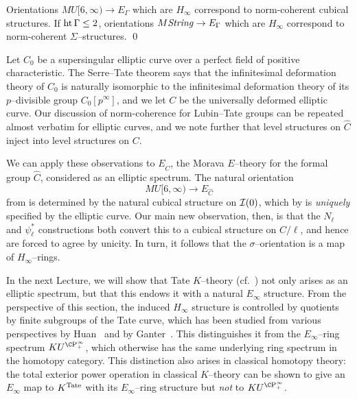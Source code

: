 \begin{theorem}
Orientations \(MU[6, \infty) \to E_\Gamma\) which are \(H_\infty\) correspond to norm-coherent cubical structures.  If \(\operatorname{ht}{\Gamma} \le 2\), orientations \(M\mathit{String} \to E_\Gamma\) which are \(H_\infty\) correspond to norm-coherent \(\Sigma\)--structures. \qed
\end{theorem}

\begin{example}
Let \(C_0\) be a supersingular elliptic curve over a perfect field of positive characteristic.  The Serre--Tate theorem says that the infinitesimal deformation theory of \(C_0\) is naturally isomorphic to the infinitesimal deformation theory of its \(p\)--divisible group \(C_0[p^\infty]\), and we let \(C\) be the universally deformed elliptic curve.  Our discussion of norm-coherence for Lubin--Tate groups can be repeated almost verbatim for elliptic curves, and we note further that level structures on \(\widehat C\) inject into level structures on \(C\).

We can apply these observations to \(E_{\widehat C}\), the Morava \(E\)--theory for the formal group \(\widehat C\), considered as an elliptic spectrum.  The natural orientation \[MU[6, \infty) \to E_{\widehat C}\] from  is determined by the natural cubical structure on \(\mathcal{I}(0)\), which by  is \emph{uniquely} specified by the elliptic curve.  Our main new observation, then, is that the \(N_\ell\) and \(\psi_\ell^*\) constructions both convert this to a cubical structure on \(C / \ell\), and hence are forced to agree by unicity.  In turn, it follows that the \(\sigma\)--orientation is a map of \(H_\infty\)--rings.
\end{example}

\begin{remark}
In the next Lecture, we will show that Tate \(K\)--theory (cf.\ ) not only arises as an elliptic spectrum, but that this endows it with a natural \(E_\infty\) structure.  From the perspective of this section, the induced \(H_\infty\) structure is controlled by quotients by finite subgroups of the Tate curve, which has been studied from various perspectives by Huan~\cite{Huan} and by Ganter~\cite{GanterStringyOpns,GanterPowerOpnsInTateKthy}.  This distinguishes it from the \(E_\infty\)--ring spectrum \(KU^{\CP^\infty_+}\), which otherwise has the same underlying ring spectrum in the homotopy category.  This distinction also arises in classical homotopy theory: the total exterior power operation in classical \(K\)--theory can be shown to give an \(E_\infty\) map to \(K^{\mathrm{Tate}}\) with its \(E_\infty\)--ring structure but \emph{not} to \(KU^{\CP^\infty_+}\).
\end{remark}
















